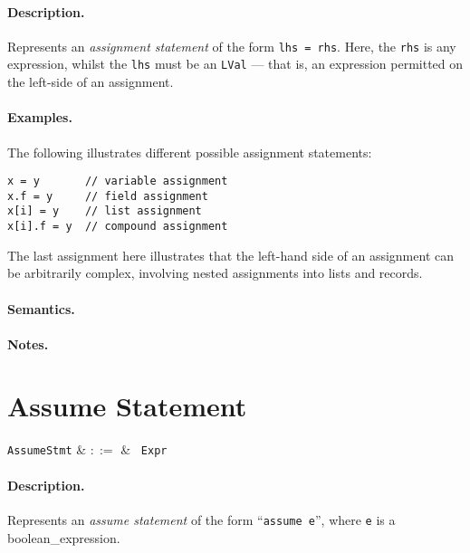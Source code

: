 \paragraph{Description.}  Represents an {\em assignment statement} of the
form \lstinline{lhs = rhs}.  Here, the \lstinline{rhs} is any
expression, whilst the \lstinline{lhs} must be an \lstinline{LVal} ---
that is, an expression permitted on the left-side of an assignment.

\paragraph{Examples.} The following illustrates different possible assignment statements:
\begin{lstlisting}
x = y       // variable assignment
x.f = y     // field assignment
x[i] = y    // list assignment
x[i].f = y  // compound assignment
\end{lstlisting}

The last assignment here illustrates that the left-hand side of an
assignment can be arbitrarily complex, involving nested assignments
into lists and records.

\paragraph{Semantics.}

\paragraph{Notes.} 


\section{Assume Statement}

\begin{syntax}
  \verb+AssumeStmt+ & $::=$ & \ \verb+Expr+\\
\end{syntax}

\paragraph{Description.}  Represents an {\em assume statement} of the form
``\lstinline{assume e}'', where \lstinline{e} is a \gls{boolean_expression}. 

